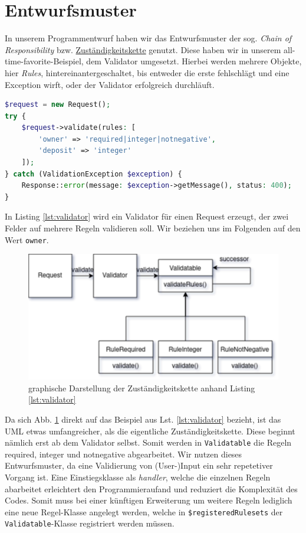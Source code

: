 \documentclass[12pt,a4paper,titlepage,ngerman,pdftex]{report}
\begin{document}
    \section{Entwurfsmuster}\label{sec:Entwurfsmuster}
    In unserem Programmentwurf haben wir das Entwurfsmuster der sog. \textit{Chain of Responsibility} bzw. \href{https://de.wikipedia.org/wiki/Zust%C3%A4ndigkeitskette}{Zuständigkeitskette} genutzt.
    Diese haben wir in unserem all-time-favorite-Beispiel, dem Validator umgesetzt.
    Hierbei werden mehrere Objekte, hier \textit{Rules}, hintereinantergeschaltet, bis entweder die erste fehlschlägt und eine Exception wirft, oder der Validator erfolgreich durchläuft.

    \begin{lstlisting}[language=php,label={lst:validator},escapechar=\%,caption={Beispiel Zuständigkeitskette - Code-Ausschnitt aus AccountController.php}]
$request = new Request();
try {
    $request->validate(rules: [
        'owner' => 'required|integer|notnegative',
        'deposit' => 'integer'
    ]);
} catch (ValidationException $exception) {
    Response::error(message: $exception->getMessage(), status: 400);
}
    \end{lstlisting}

    In Listing \ref{lst:validator} wird ein Validator für einen Request erzeugt, der zwei Felder auf mehrere Regeln validieren soll.
    Wir beziehen uns im Folgenden auf den Wert \verb|owner|.

    \begin{figure}[h!]
        \centering
        \includegraphics[width=0.75\linewidth]{COR.drawio}
        \caption{graphische Darstellung der Zuständigkeitskette anhand Listing \ref{lst:validator}}
        \label{fig:cor}
    \end{figure}

    Da sich Abb. \ref{fig:cor} direkt auf das Beispiel aus Lst. \ref{lst:validator} bezieht, ist das UML etwas umfangreicher, als die eigentliche Zuständigkeitskette.
    Diese beginnt nämlich erst ab dem Validator selbst.
    Somit werden in \verb|Validatable| die Regeln required, integer und notnegative abgearbeitet.
    Wir nutzen dieses Entwurfsmuster, da eine Validierung von (User-)Input ein sehr repetetiver Vorgang ist.
    Eine Einstiegsklasse als \textit{handler}, welche die einzelnen Regeln abarbeitet erleichtert den Programmieraufand und reduziert die Komplexität des Codes.
    Somit muss bei einer künftigen Erweiterung um weitere Regeln lediglich eine neue Regel-Klasse angelegt werden, welche in \verb|$registeredRulesets| der \verb|Validatable|-Klasse registriert werden müssen.
\end{document}
